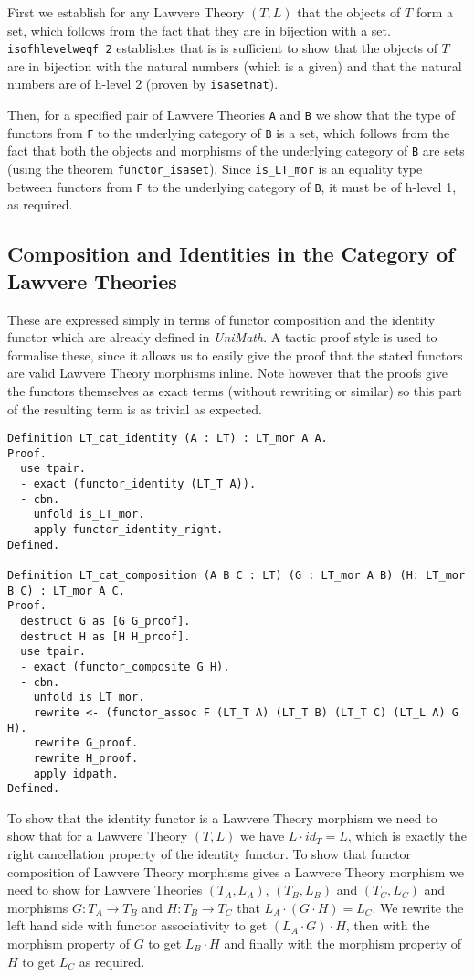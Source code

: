 First we establish for any Lawvere Theory $(T, L)$ that the objects of $T$ form
a set, which follows from the fact that they are in bijection with a set.
\lstinline|isofhlevelweqf 2| establishes that is is sufficient to show that the
objects of $T$ are in bijection with the natural numbers (which is a given) and
that the natural numbers are of h-level 2 (proven by \lstinline|isasetnat|).

Then, for a specified pair of Lawvere Theories \lstinline|A| and \lstinline|B|
we show that the type of functors from \lstinline|F| to the underlying category
of \lstinline|B| is a set, which follows from the fact that both the objects and
morphisms of the underlying category of \lstinline|B| are sets (using the
theorem \lstinline|functor_isaset|). Since \lstinline|is_LT_mor| is an equality
type between functors from \lstinline|F| to the underlying category of
\lstinline|B|, it must be of h-level 1, as required.

\subsection{Composition and Identities in the Category of Lawvere Theories}
These are expressed simply in terms of functor composition and the identity
functor which are already defined in \textit{UniMath}. A tactic proof style is
used to formalise these, since it allows us to easily give the proof that the
stated functors are valid Lawvere Theory morphisms inline. Note however that
the proofs give the functors themselves as exact terms (without rewriting or
similar) so this part of the resulting term is as trivial as expected.
\begin{lstlisting}
Definition LT_cat_identity (A : LT) : LT_mor A A.
Proof.
  use tpair.
  - exact (functor_identity (LT_T A)).
  - cbn.
    unfold is_LT_mor.
    apply functor_identity_right.
Defined.

Definition LT_cat_composition (A B C : LT) (G : LT_mor A B) (H: LT_mor B C) : LT_mor A C.
Proof.
  destruct G as [G G_proof].
  destruct H as [H H_proof].
  use tpair.
  - exact (functor_composite G H).
  - cbn.
    unfold is_LT_mor.
    rewrite <- (functor_assoc F (LT_T A) (LT_T B) (LT_T C) (LT_L A) G H).
    rewrite G_proof.
    rewrite H_proof.
    apply idpath.
Defined.
\end{lstlisting}

To show that the identity functor is a Lawvere Theory morphism we need to show
that for a Lawvere Theory $(T, L)$ we have $L\cdot id_T = L$, which is exactly
the right cancellation property of the identity functor. To show that functor
composition of Lawvere Theory morphisms gives a Lawvere Theory morphism we need
to show for Lawvere Theories $(T_A, L_A)$, $(T_B, L_B)$ and $(T_C, L_C)$
and morphisms $G: T_A\to T_B$ and $H: T_B\to T_C$ that $L_A\cdot (G\cdot H) =
L_C$. We rewrite the left hand side with functor associativity to get $(L_A\cdot
G)\cdot H$, then with the morphism property of $G$ to get $L_B\cdot H$ and
finally with the morphism property of $H$ to get $L_C$ as required.

